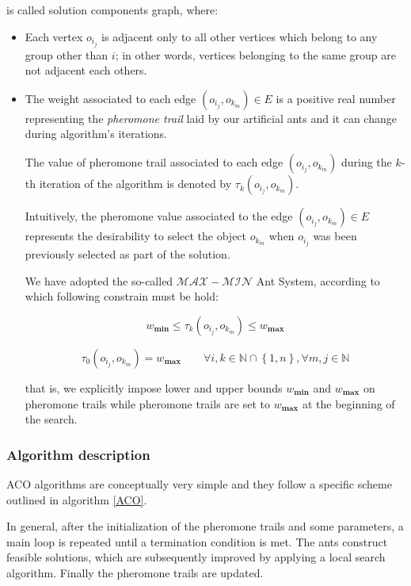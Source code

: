 \documentclass[12pt,a4paper]{report}
\newcommand{\N}{\mathbb{N}}
\begin{document}
is called solution components graph, where:
 
\begin{itemize}
	
	\item Each vertex $o_{i_j}$ is adjacent only to all other vertices which belong to any group other than $i$; in other words, vertices belonging to the same group are not adjacent each others.
	
	\item The weight associated to each edge $(o_{i_j}, o_{k_m}) \in E$ is a positive real number representing the \textit{pheromone trail} laid by our artificial ants and it can change during algorithm's iterations. 
	
	The value of pheromone trail associated to each edge $(o_{i_j}, o_{k_m})$ during the $k$-th iteration of the algorithm is denoted by $\tau_k(o_{i_j}, o_{k_m})$.
	
	Intuitively, the pheromone value associated to the edge $(o_{i_j}, o_{k_m}) \in E$ represents the desirability to select the object $o_{k_m}$ when $o_{i_j}$ was been previously selected as part of the solution. 
	
	We have adopted the so-called $\mathcal{MAX} - \mathcal{MIN}$ Ant System, according to which following constrain must be hold:
	
	\begin{equation}
		w_{\textbf{min}} \leq \tau_k(o_{i_j}, o_{k_m}) \leq w_{\textbf{max}} 
	\end{equation}

	\begin{equation}
		\tau_0(o_{i_j}, o_{k_m}) = w_{\textbf{max}} \qquad \forall i,k \in \N \cap \left\{1,n\right\}, \forall m,j \in \N 
	\end{equation}
	
	that is, we explicitly impose lower and upper bounds $w_{\textbf{min}}$ and $w_{\textbf{max}}$ on pheromone
	trails while pheromone trails are set to $w_{\textbf{max}}$ at the beginning of the search.
\end{itemize}

\subsubsection{Algorithm description}

ACO algorithms are conceptually very simple and they follow a specific scheme outlined in algorithm \ref{ACO}.

In general, after the initialization of the pheromone trails and some parameters, a main loop is repeated until a termination condition is met. The ants construct feasible solutions, which are subsequently improved by applying a local search algorithm. Finally the pheromone trails are updated.
\end{document}
